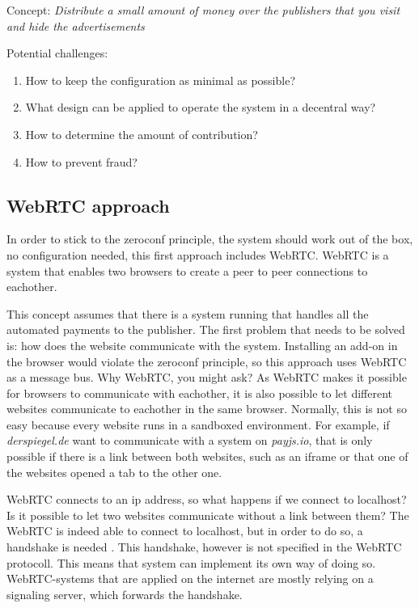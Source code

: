 Concept: \textit{Distribute a small amount of money over the publishers that you visit and hide the advertisements}

\vspace{2em}

Potential challenges:
\begin{enumerate}
  \item How to keep the configuration as minimal as possible?
  \item What design can be applied to operate the system in a decentral way?
  \item How to determine the amount of contribution?
  \item How to prevent fraud?
\end{enumerate}

\subsection{WebRTC approach}

In order to stick to the zeroconf principle, the system should work out of the box, no configuration needed, this first approach includes WebRTC. WebRTC is a system that enables two browsers to create a peer to peer connections to eachother.

This concept assumes that there is a system running that handles all the automated payments to the publisher. The first problem that needs to be solved is: how does the website communicate with the system. Installing an add-on in the browser would violate the zeroconf principle, so this approach uses WebRTC as a message bus. Why WebRTC, you might ask? As WebRTC makes it possible for browsers to communicate with eachother, it is also possible to let different websites communicate to eachother in the same browser. Normally, this is not so easy because every website runs in a sandboxed environment. For example, if \textit{derspiegel.de} want to communicate with a system on \textit{payjs.io}, that is only possible if there is a link between both websites, such as an iframe or that one of the websites opened a tab to the other one. 

WebRTC connects to an ip address, so what happens if we connect to localhost? Is it possible to let two websites communicate without a link between them? The WebRTC is indeed able to connect to localhost, but in order to do so, a handshake is needed \cite{dutton2013webrtc}. This handshake, however is not specified in the WebRTC protocoll. This means that system can implement its own way of doing so. WebRTC-systems that are applied on the internet are mostly relying on a signaling server, which forwards the handshake. 

